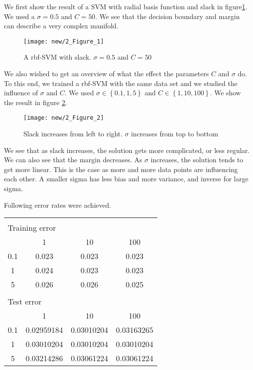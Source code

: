 We first show the result of a SVM with radial basis function and slack in figure\ref{task2::example}. We used a $\sigma = 0.5$ and $C=50$. We see that the decision boundary and margin can  describe a very complex manifold.
\begin{figure}
	\texttt{[image: new/2\_Figure\_1]}
	\caption{A rbf-SVM with slack. $\sigma = 0.5$ and $C=50$}
	\label{task2::example}
\end{figure}

We also wished to get an overview of what the effect the parameters $C$ and $\sigma$ do. To this end, we trained a rbf-SVM with the same data set and we studied the influence of $\sigma$ and $C$. We used $\sigma\in\left\{ 0.1, 1, 5 \right\}$ and  $C\in\left\{ 1, 10, 100 \right\}$. We show the result in figure \ref{task2::influence}.
\begin{figure}
	\texttt{[image: new/2\_Figure\_2]}
	\caption{Slack increases from left to right. $\sigma$ increases from top to bottom}
	\label{task2::influence}
\end{figure}

We see that as slack increases, the solution gets more complicated, or less regular. We can also see that the margin decreases. As $\sigma$ increases, the solution tends to get more linear. This is the case as more and more data points are influencing each other. A smaller sigma has less bias and more variance, and inverse for large sigma.

Following error rates were achieved.
\begin{tabular}{|c|c|c|c|}
\multicolumn{3}{l}{}\\
\multicolumn{3}{l}{Training error}\\
\hline
&1&10&100\\
\hline
0.1&0.023&0.023&0.023\\
\hline
1&0.024&0.023&0.023\\
\hline
5&0.026&0.026&0.025\\
\hline
\multicolumn{3}{l}{}\\
\multicolumn{3}{l}{Test error}\\
\hline
&1&10&100\\
\hline
0.1&0.02959184&0.03010204&0.03163265\\
\hline
1&0.03010204&0.03010204&0.03010204\\
\hline
5&0.03214286&0.03061224&0.03061224\\
\hline
\end{tabular}\\

